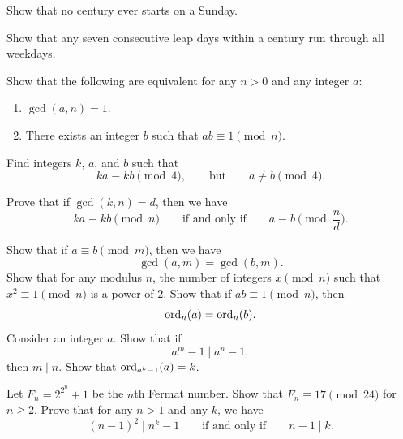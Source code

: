 \begin{routine}
  \exercise
  \begin{subexenum}
  \item Show that no century ever starts on a Sunday.
  \item Show that any seven consecutive leap days within a century run through all weekdays.
  \end{subexenum}
  \exercise Show that the following are equivalent for any $n>0$ and any integer $a$:
  \begin{enumerate}
  \item $\gcd(a,n)=1$.
  \item There exists an integer $b$ such that $ab\equiv 1\pmod{n}$.
  \end{enumerate}
  \exercise
  \begin{subexenum}
  \item Find integers $k$, $a$, and $b$ such that
    \begin{equation*}
      ka\equiv kb\pmod{4},\qquad\text{but}\qquad a\nequiv b\pmod{4}.
    \end{equation*}
  \item Prove that if $\gcd(k,n)=d$, then we have
    \begin{equation*}
      ka\equiv kb\pmod{n}\qquad\text{if and only if}\qquad a\equiv b\pmod{\frac{n}{d}}.
    \end{equation*}
  \end{subexenum}
  \exercise Show that if $a\equiv b\pmod{m}$, then we have
  \begin{equation*}
    \gcd(a,m)=\gcd(b,m).
  \end{equation*}
  \exercise Show that for any modulus $n$, the number of integers $x\pmod{n}$ such that $x^2\equiv 1\pmod{n}$ is a power of $2$.
  \exercise Show that if $ab\equiv 1\pmod{n}$, then
  \begin{equation*}
    \operatorname{ord}_n(a)=\operatorname{ord}_n(b).
  \end{equation*}
  \exercise Consider an integer $a$. Show that if
  \begin{equation*}
    a^m-1 \mid a^n-1,
  \end{equation*}
  then $m\mid n$.
  \exercise Show that $\operatorname{ord}_{a^k-1}(a)=k$.
\end{routine}

\begin{challenge}
  \exercise Let $F_n=2^{2^n}+1$ be the $n$th Fermat number. Show that $F_n\equiv 17\pmod{24}$ for $n\geq 2$.
  \exercise Prove that for any $n>1$ and any $k$, we have
  \begin{equation*}
    (n-1)^2\mid n^k-1\qquad\text{if and only if}\qquad n-1\mid k.
  \end{equation*}
\end{challenge}

